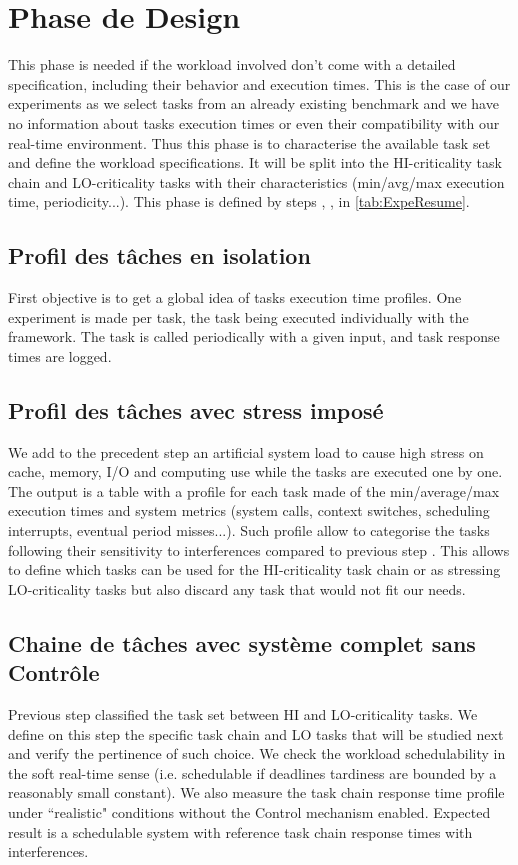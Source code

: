 \documentclass[french, a4paper, 11pt, twoside, pdftex]{StyleThese}
\begin{document}
\section{Phase de Design}
            This phase is needed if the workload involved don't come with a detailed specification, including their behavior and execution times. This is the case of our experiments as we select tasks from an already existing benchmark and we have no information about tasks execution times or even their compatibility with our real-time environment. Thus this phase is to characterise the available task set and define the workload specifications. It will be split into the HI-criticality task chain and LO-criticality tasks with their characteristics (min/avg/max execution time, periodicity...). This phase is defined by steps \circleTxt[1], \circleTxt[2], \circleTxt[3] in \autoref{tab:ExpeResume}.
            
    \subsection{Profil des tâches en isolation}
                    First objective is to get a global idea of tasks execution time profiles. One experiment is made per task, the task being executed individually with the framework. The task is called periodically with a given input, and task response times are logged.
                    
    \subsection{Profil des tâches avec stress imposé}
                    We add to the precedent step an artificial system load to cause high stress on cache, memory, I/O and computing use while the tasks are executed one by one. The output is a table with a profile for each task made of the min/average/max execution times and system metrics (system calls, context switches, scheduling interrupts, eventual period misses...). Such profile allow to categorise the tasks following their sensitivity to interferences compared to previous step \circleTxt[1]. This allows to define which tasks can be used for the HI-criticality task chain or as stressing LO-criticality tasks but also discard any task that would not fit our needs.
                    
    \subsection{Chaine de tâches avec système complet sans Contrôle}
                	Previous step classified the task set between HI and LO-criticality tasks. We define on this step the specific task chain and LO tasks that will be studied next and verify the pertinence of such choice. We check the workload schedulability in the soft real-time sense (i.e. schedulable if deadlines tardiness are bounded by a reasonably small constant). We also measure the task chain response time profile under ``realistic" conditions without the Control mechanism enabled. Expected result is a schedulable system with reference task chain response times with interferences.
                	
\end{document}
